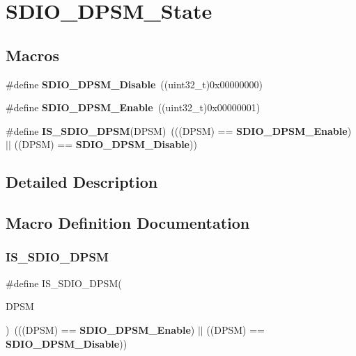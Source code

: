 \section{S\+D\+I\+O\+\_\+\+D\+P\+S\+M\+\_\+\+State}
\label{group__SDIO__DPSM__State}
\subsection*{Macros}
\begin{DoxyCompactItemize}
\item 
\#define \textbf{ S\+D\+I\+O\+\_\+\+D\+P\+S\+M\+\_\+\+Disable}~((uint32\+\_\+t)0x00000000)
\item 
\#define \textbf{ S\+D\+I\+O\+\_\+\+D\+P\+S\+M\+\_\+\+Enable}~((uint32\+\_\+t)0x00000001)
\item 
\#define \textbf{ I\+S\+\_\+\+S\+D\+I\+O\+\_\+\+D\+P\+SM}(D\+P\+SM)~(((D\+P\+SM) == \textbf{ S\+D\+I\+O\+\_\+\+D\+P\+S\+M\+\_\+\+Enable}) $\vert$$\vert$ ((D\+P\+SM) == \textbf{ S\+D\+I\+O\+\_\+\+D\+P\+S\+M\+\_\+\+Disable}))
\end{DoxyCompactItemize}


\subsection{Detailed Description}


\subsection{Macro Definition Documentation}
\mbox{\label{group__SDIO__DPSM__State_gac87a2d7a8fc417a4514d733be50e6d63}} 
\subsubsection{I\+S\+\_\+\+S\+D\+I\+O\+\_\+\+D\+P\+SM}
{\footnotesize\ttfamily \#define I\+S\+\_\+\+S\+D\+I\+O\+\_\+\+D\+P\+SM(\begin{DoxyParamCaption}\item[{}]{D\+P\+SM }\end{DoxyParamCaption})~(((D\+P\+SM) == \textbf{ S\+D\+I\+O\+\_\+\+D\+P\+S\+M\+\_\+\+Enable}) $\vert$$\vert$ ((D\+P\+SM) == \textbf{ S\+D\+I\+O\+\_\+\+D\+P\+S\+M\+\_\+\+Disable}))}



